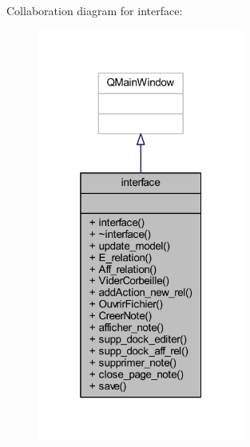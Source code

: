 Collaboration diagram for interface\+:\nopagebreak
\begin{figure}[H]
\begin{center}
\leavevmode
\includegraphics[width=193pt]{classinterface__coll__graph}
\end{center}
\end{figure}
